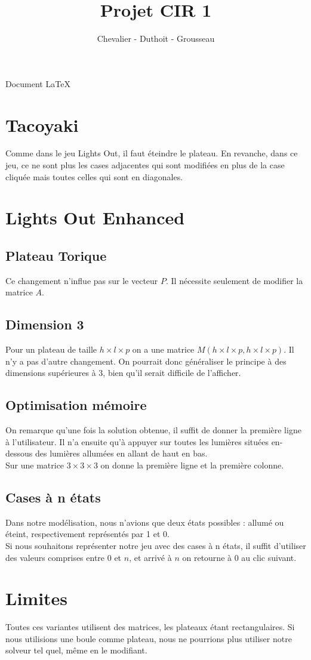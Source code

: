 \documentclass[12pt,a4paper]{article}
\title{Projet CIR 1}
\author{Chevalier - Duthoit - Grousseau}
\date{}
\begin{document}
\maketitle
Document \LaTeX
\section{Tacoyaki}
Comme dans le jeu Lights Out, il faut éteindre le plateau. En revanche, dans ce jeu, ce ne sont plus les cases adjacentes qui sont modifiées en plus de la case cliquée mais toutes celles qui sont en diagonales.
\section{Lights Out Enhanced}
\subsection{Plateau Torique}
Ce changement n'influe pas sur le vecteur $P$. Il nécessite seulement de modifier la matrice $A$.
\subsection{Dimension 3}
Pour un plateau de taille $h \times l \times p$ on a une matrice $M(h \times l \times p,h \times l \times p)$. Il n'y a pas d'autre changement. On pourrait donc généraliser le principe à des dimensions supérieures à 3, bien qu'il serait difficile de l'afficher.
\subsection{Optimisation mémoire}
On remarque qu'une fois la solution obtenue, il suffit de donner la première ligne à l'utilisateur. Il n'a ensuite qu'à appuyer sur toutes les lumières situées en-dessous des lumières allumées en allant de haut en bas. \\
Sur une matrice $3 \times 3 \times 3$ on donne la première ligne et la première colonne.  
\subsection{Cases à n états}
Dans notre modélisation, nous n'avions que deux états possibles : allumé ou éteint, respectivement représentés par 1 et 0. \\
Si nous souhaitons représenter notre jeu avec des cases à n états, il suffit d'utiliser des valeurs comprises entre $0$ et $n$, et arrivé à $n$ on retourne à $0$ au clic suivant.
\section{Limites}
Toutes ces variantes utilisent des matrices, les plateaux étant rectangulaires. Si nous utilisions une boule comme plateau, nous ne pourrions plus utiliser notre solveur tel quel, même en le modifiant.
\end{document}
